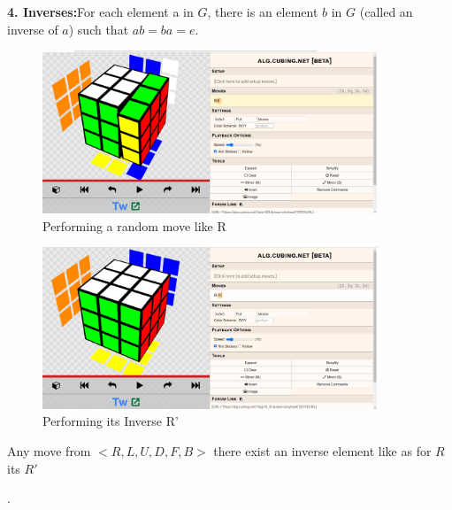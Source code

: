 \documentclass{article}
\begin{document}
\textbf{4. Inverses:}For each element a in $G$, there is an element $b$ in $G$ (called
an inverse of $a$) such that $ab = ba = e$.\\
\begin{figure}[h!]
    \centering
    \includegraphics[width = 10cm ]{Screenshot 2023-08-16 153653.png}
    \caption{Performing a random move like R}
    \label{(RU R'U') R U or $ (a * b)*c $}
\end{figure}
\begin{figure}[h!]
    \centering
    \includegraphics[width = 10cm ]{Screenshot 2023-07-06 005358.png}
    \caption{Performing its Inverse R'}
    \label{(RU R'U') R U or $ (a * b)*c $}
\end{figure}
Any move from $< R , L , U , D , F , B  >$ there exist an inverse element like as for $R$ its $R'$


.\\\\\\
\end{document}
